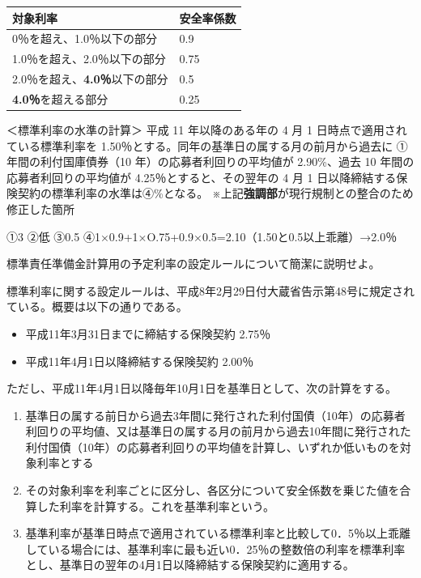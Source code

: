 \documentclass[report,gutter=10mm,fore-edge=10mm,uplatex,dvipdfmx]{jlreq}
\begin{document}
\begin{longtable}[]{@{}ll@{}}
\toprule
対象利率 & 安全率係数\tabularnewline
\midrule
\endhead
0％を超え、1.0％以下の部分 & 0.9\tabularnewline
1.0％を超え、2.0％以下の部分 & 0.75\tabularnewline
2.0％を超え、\textbf{4.0％}以下の部分 & 0.5\tabularnewline
\textbf{4.0％}を超える部分 & 0.25\tabularnewline
\bottomrule
\end{longtable}

＜標準利率の水準の計算＞ 平成 11 年以降のある年の 4 月 1
日時点で適用されている標準利率を
1.50％とする。同年の基準日の属する月の前月から過去に
①年間の利付国庫債券（10 年）の応募者利回りの平均値が 2.90\%、過去 10
年間の応募者利回りの平均値が 4.25％とすると、その翌年の 4 月 1
日以降締結する保険契約の標準利率の水準は④\%となる。
※上記\textbf{強調部}が現行規制との整合のため修正した箇所


①3 ②低 ③0.5 ④1×0.9+1×O.75+0.9×0.5=2.10（1.50と0.5以上乖離）→2.0％



標準責任準備金計算用の予定利率の設定ルールについて簡潔に説明せよ。



標準利率に関する設定ルールは、平成8年2月29日付大蔵省告示第48号に規定されている。概要は以下の通りである。

\begin{itemize}
\tightlist
\item
  平成11年3月31日までに締結する保険契約 2.75％
\item
  平成11年4月1日以降締結する保険契約 2.00％
\end{itemize}
  ただし、平成11年4月1日以降毎年10月1日を基準日として、次の計算をする。
\begin{enumerate}[ (A)]
\item 基準日の属する前日から過去3年間に発行された利付国債（10年）の応募者利回りの平均値、又は基準日の属する月の前月から過去10年間に発行された利付国債（10年）の応募者利回りの平均値を計算し、いずれか低いものを対象利率とする
\item その対象利率を利率ごとに区分し、各区分について安全係数を乗じた値を合算した利率を計算する。これを基準利率という。
\item 基準利率が基準日時点で適用されている標準利率と比較して0．5％以上乖離している場合には、基準利率に最も近い0．25％の整数倍の利率を標準利率とし、基準日の翌年の4月1日以降締結する保険契約に適用する。
\end{enumerate}
\end{document}
